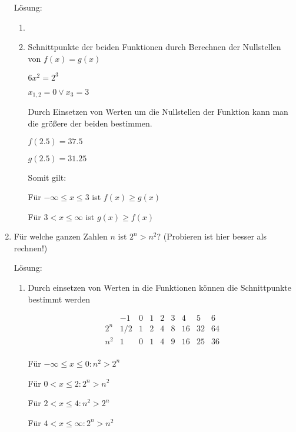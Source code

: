 \documentclass[../main.tex]{subfiles}
\begin{document}
\begin{enumerate}
	      Lösung:
	      \begin{enumerate}
		      \item
		      \item Schnittpunkte der beiden Funktionen durch Berechnen
		            der Nullstellen von \( f(x) = g(x) \)

		            \( 6x^2 = 2^3 \)

		            \( x_{1,2} = 0 \lor x_3 = 3 \)

		            Durch Einsetzen von Werten um die Nullstellen der Funktion kann man die größere der
		            beiden bestimmen.

		            \( f(2.5) = 37.5 \)

		            \( g(2.5) = 31.25\)

		            Somit gilt:

		            Für \( -\infty \leq x \leq 3 \) ist \( f(x) \geq g(x) \)

		            Für \( 3 < x \leq \infty \) ist \( g(x) \geq f(x) \)
	      \end{enumerate}
	\item Für welche ganzen Zahlen \( n \) ist \( 2^n > n^2 \)?
	      (Probieren ist hier besser als rechnen!)

	      Lösung:
	      \begin{enumerate}
		      \item Durch einsetzen von Werten in die Funktionen können die Schnittpunkte bestimmt werden

		            \[ \begin{array}{c|cccccccc}
				                & -1    & 0 & 1 & 2 & 3 & 4  & 5  & 6  \\
				            \hline
				            2^n & 1 / 2 & 1 & 2 & 4 & 8 & 16 & 32 & 64 \\
				            n^2 & 1     & 0 & 1 & 4 & 9 & 16 & 25 & 36 \\
			            \end{array} \]

		            Für \( -\infty \leq x \leq 0 : n^2 > 2^n \)

		            Für \( 0 < x \leq 2 : 2^n > n^2 \)

		            Für \( 2 < x \leq 4 : n^2 > 2^n \)

		            Für \( 4 < x \leq \infty : 2^n > n^2 \)


\end{enumerate}
\end{enumerate}
\end{document}
